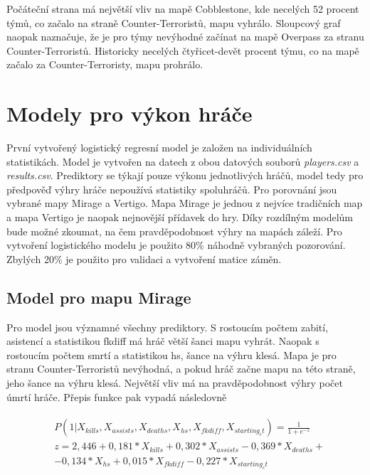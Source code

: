 Počáteční strana má největší vliv na mapě Cobblestone, kde necelých 52 procent týmů, co začalo na straně Counter-Terroristů, mapu vyhrálo. Sloupcový graf naopak naznačuje, že 
je pro týmy nevýhodné začínat na mapě Overpass za stranu Counter-Terroristů. Historicky necelých čtyřicet-devět procent týmu, co na mapě začalo za Counter-Terroristy, mapu prohrálo.

\section{Modely pro výkon hráče}
První vytvořený logistický regresní model je založen na individuálních statistikách. Model je vytvořen na datech z obou datových souborů \textit{players.csv} a \textit{results.csv}.
Prediktory se týkají pouze výkonu jednotlivých hráčů, model tedy pro předpověď výhry hráče nepoužívá statistiky spoluhráčů. Pro porovnání jsou vybrané mapy Mirage a Vertigo.
Mapa Mirage je jednou z nejvíce tradičních map a mapa Vertigo je naopak nejnovější přídavek do hry. Díky rozdílným modelům bude možné zkoumat, na čem pravděpodobnost výhry na 
mapách záleží. Pro vytvoření logistického modelu je použito 80\% náhodně vybraných pozorování. Zbylých 20\% je použito pro validaci a vytvoření matice záměn.

\subsection{Model pro mapu Mirage}



Pro model jsou významné všechny prediktory. S rostoucím počtem zabití, asistencí a statistikou fkdiff má hráč větší šanci mapu vyhrát. Naopak s rostoucím počtem smrtí a 
statistikou hs, šance na výhru klesá. Mapa je pro stranu Counter-Terroristů nevýhodná, a pokud hráč začne mapu na této straně, jeho šance na výhru klesá. Největší vliv
má na pravděpodobnost výhry počet úmrtí hráče. Přepis funkce pak vypadá následovně

\begin{align}
    \begin{split}
        &P(1 | X_{kills}, X_{assists}, X_{deaths}, X_{hs}, X_{fkdiff}, X_{starting_ct}) = \frac{1}{1 + e^{-z}} \\
        &z = 2,446 + 0,181*X_{kills} + 0,302*X_{assists} - 0,369*X_{deaths} + \\
        &- 0,134*X_{hs} + 0,015*X_{fkdiff} - 0,227*X_{starting_ct}
    \end{split}
\end{align}

